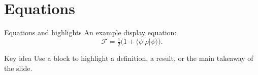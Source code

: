 \section{Equations}

\begin{frame}{Equations and highlights}
An example display equation:
\[
  \mathcal{F} = \tfrac{1}{2}\bigl(1 + \langle\psi|\rho|\psi\rangle\bigr).
\]
\vspace{0.4em}

\begin{block}{Key idea}
Use a block to highlight a definition, a result, or the main takeaway of the
slide.
\end{block}
\end{frame}
